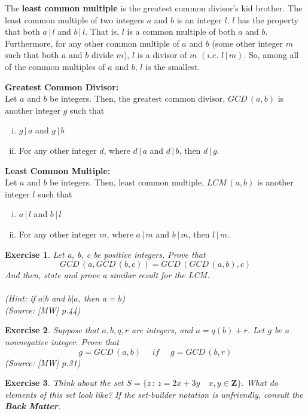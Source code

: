 \documentclass{article}
\newtheorem*{exe}{Exercise}
\newcommand{\divv}{\,|\,}
\newcommand{\GCD}[2]{GCD\,(#1, #2)}
\newcommand{\LCM}[2]{LCM\,(#1, #2)}
\begin{document}
The \textbf{least common multiple} is the greatest common divisor’s kid brother. The least common multiple of two integers \(a\) and \(b\) is an integer \(l\). \(l\) has the property that both \(a\divv l\) and \(b\divv l\). That is, \(l\) is a common multiple of both \(a\) and \(b\). Furthermore, for any other common multiple of \(a\) and \(b\) (some other integer \(m\) such that both \(a\) and \(b\) divide \(m\)), \(l\) is a divisor of \(m\) \((i.e. \,\,l\divv m)\). So, among all of the common multiples of \(a\) and \(b\), \(l\) is the smallest. 

\begin{mdframed}
\textbf{Greatest Common Divisor:} \\
Let $a$ and $b$ be integers. Then, the greatest common divisor, $\GCD{a}{b}$ is another integer $g$ such that 
\begin{enumerate}[(i)]
\item $g\divv a$ and $g\divv b$
\item For any other integer $d$, where $d\divv a$ and $d\divv b$, then $d\divv g$. 
\end{enumerate}
\end{mdframed} 
\begin{mdframed}
\textbf{Least Common Multiple:} \\
Let $a$ and $b$ be integers. Then, least common multiple, $\LCM{a}{b}$ is another integer $l$ such that 
\begin{enumerate}[(i)]
\item $a\divv l$ and $b\divv l$
\item For any other integer $m$, where $a\divv m$ and $b\divv m$, then $l\divv m$. 
\end{enumerate}
\end{mdframed}

 
\begin{exe} Let a, b, c be positive integers. 
Prove that 
\[\GCD{a}{\GCD{b}{c}} = \GCD{\GCD{a}{b}}{c}\] 
And then, state and prove a similar result for the LCM. \\\\
(Hint: if $a|b$ and $b|a$, then $a=b$)\\(Source: [MW] p.44)  
\end{exe} \medskip
\begin{exe} Suppose that $a, b, q, r$ are integers, and $a=q(b) + r$. Let $g$ be a nonnegative integer. Prove that
\[g = \GCD{a}{b} \quad\textit{ if }\quad g = \GCD{b}{r}\]
(Source: [MW] p.31)
\end{exe} \medskip
\begin{exe} 
Think about the set $S = \{z \,:\, z = 2x + 3y \quad x, y\in \mathbf{Z}\}$. What do elements of this set look like? If the set-builder notation is unfriendly, consult the \textbf{Back Matter}. 
\end{exe} 
\end{document}
